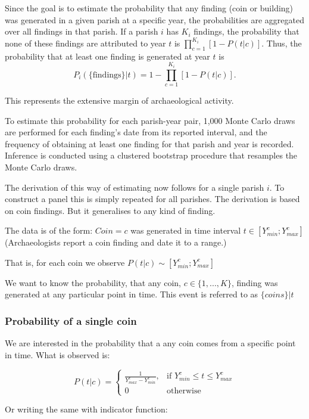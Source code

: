 Since the goal is to estimate the probability that any finding (coin or building) was generated in a given parish at a specific year, the probabilities are aggregated over all findings in that parish. If a parish $i$ has $K_i$ findings, the probability that none of these findings are attributed to year $t$ is $\prod_{c=1}^{K_i} \left[ 1 - P(t|c) \right]$. Thus, the probability that at least one finding is generated at year $t$ is
$$
P_i(\{ \text{findings} \}|t)=1 - \prod_{c=1}^{K_i} \left[ 1-P(t|c) \right].
$$

This represents the extensive margin of archaeological activity. 

To estimate this probability for each parish-year pair, 1,000 Monte Carlo draws are performed for each finding's date from its reported interval, and the frequency of obtaining at least one finding for that parish and year is recorded. Inference is conducted using a clustered bootstrap procedure that resamples the Monte Carlo draws.

The derivation of this way of estimating now follows for a single parish $i$. To construct a panel this is simply repeated for all parishes. The derivation is based on coin findings. But it generalises to any kind of finding.    

The data is of the form: $Coin=c$ was generated in time interval $t\in [Y_{min}^c;Y_{max}^c]$ (Archaeologists report a coin finding and date it to a range.)

That is, for each coin we observe $P(t|c)\sim [Y_{min}^c;Y_{max}^c]$ 

We want to know the probability, that any coin, $c\in \{1, ..., K\}$, finding was generated at any particular point in time. This event is referred to as $\{coins\}|t$

\subsubsection{Probability of a single coin} 
We are interested in the probability that a any coin comes from a specific point in time. What is observed is:

\begin{equation}
P(t|c)=\begin{cases}
\frac{1}{Y_{max}^c - Y_{min}^c}, & \text{if }Y_{min}^c\leq t \leq Y_{max}^c \\
0 & \text{otherwise}
\end{cases}
\end{equation}

Or writing the same with indicator function:

